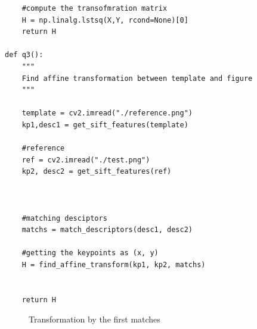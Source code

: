\documentclass[12pt]{article}
\begin{document}
\begin{enumerate}[label=(\alph*)]
\begin{verbatim}
    #compute the transofmration matrix
    H = np.linalg.lstsq(X,Y, rcond=None)[0]
    return H

def q3():
    """
    Find affine transformation between template and figure
    """

    template = cv2.imread("./reference.png")
    kp1,desc1 = get_sift_features(template) 

    #reference
    ref = cv2.imread("./test.png")
    kp2, desc2 = get_sift_features(ref)



    #matching desciptors
    matchs = match_descriptors(desc1, desc2)

    #getting the keypoints as (x, y)
    H = find_affine_transform(kp1, kp2, matchs)


    return H
\end{verbatim}

 \begin{figure}[ht]
   \centering
   \hfill
   \caption{Transformation by the first matches}
 \end{figure}

\end{enumerate}
\end{document}

